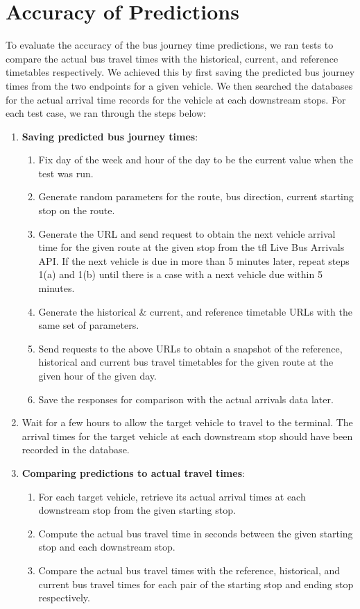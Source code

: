 \section{Accuracy of Predictions}
\label{sec:prediction_accuracy}
\par To evaluate the accuracy of the bus journey time predictions, we ran tests to compare the actual bus travel times with the historical, current, and reference timetables respectively. We achieved this by first saving the predicted bus journey times from the two endpoints for a given vehicle. We then searched the databases for the actual arrival time records for the vehicle at each downstream stops. For each test case, we ran through the steps below:

\begin{enumerate}
  \item \textbf{Saving predicted bus journey times}:
  \begin{enumerate}
    \item Fix day of the week and hour of the day to be the current value when the test was run.
    \item Generate random parameters for the route, bus direction, current starting stop on the route.
    \item Generate the URL and send request to obtain the next vehicle arrival time for the given route at the given stop from the \acrshort{tfl} Live Bus Arrivals API. If the next vehicle is due in more than 5 minutes later, repeat steps 1(a) and 1(b) until there is a case with a next vehicle due within 5 minutes.
    \item  Generate the historical \& current, and reference timetable URLs with the same set of parameters.
    \item Send requests to the above URLs to obtain a snapshot of the reference, historical and current bus travel timetables for the given route at the given hour of the given day.
    \item Save the responses for comparison with the actual arrivals data later.
  \end{enumerate}
  \item Wait for a few hours to allow the target vehicle to travel to the terminal. The arrival times for the target vehicle at each downstream stop should have been recorded in the database.
  \item \textbf{Comparing predictions to actual travel times}:
  \begin{enumerate}
    \item For each target vehicle, retrieve its actual arrival times at each downstream stop from the given starting stop.
    \item Compute the actual bus travel time in seconds between the given starting stop and each downstream stop.
    \item Compare the actual bus travel times with the reference, historical, and current bus travel times for each pair of the starting stop and ending stop respectively.
  \end{enumerate}
\end{enumerate}

